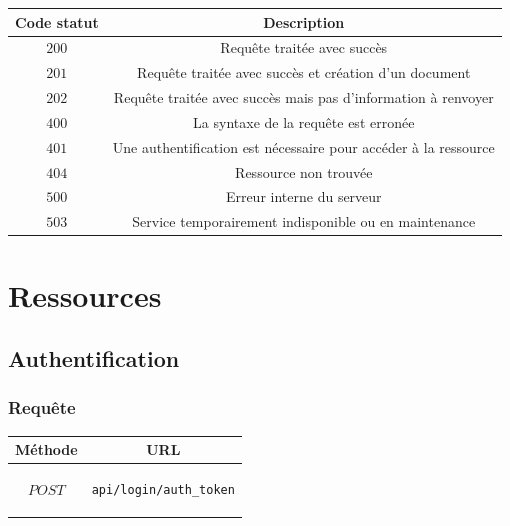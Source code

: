 \documentclass[titlepage, 12pt]{report}
\begin{document}
\begin{center}
	\begin{tabular}{|c|c|}
		\hline
		Code statut & Description \\
		\hline \hline
		$ 200 $ & Requête traitée avec succès \\
		\hline 
		$ 201 $ & Requête traitée avec succès et création d'un document \\	
		\hline 
		$ 202 $ & Requête traitée avec succès mais pas d'information à renvoyer \\
		\hline \hline 
		$ 400 $ & La syntaxe de la requête est erronée \\	
		\hline 
		$ 401 $ & Une authentification est nécessaire pour accéder à la ressource \\	
		\hline
		$ 404 $ & Ressource non trouvée \\
		\hline \hline
		$ 500 $ & Erreur interne du serveur \\
		\hline
		$ 503 $ & Service temporairement indisponible ou en maintenance \\ 	
		\hline
	\end{tabular}
\end{center}

\chapter{Ressources}

%
%
\section{Authentification}
\subsection{Requête}

\begin{center}
	\begin{tabular}{|c|c|}
		\hline
		Méthode & URL \\
		\hline
		$ POST $ 
		&
		\begin{lstlisting}
api/login/auth_token
		\end{lstlisting} 
		\\ \hline
	\end{tabular}
\end{center}
\end{document}
